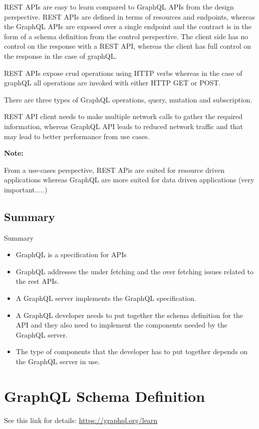 \documentclass[a4paper, 11pt]{book}
\newenvironment{note}{
    \begin{siderule}
        \textbf{Note: }
        }{
    \end{siderule}
}
\begin{document}
    REST APIs are easy to learn compared to GraphQL APIs from the design perspective.
    REST APIs are defined in terms of resources and endpoints, whereas the GraphQL APIs are exposed over a single endpoint and the contract is in the form of a schema definition from the control perspective.
    The client side has no control on the response with a REST API, whereas the client has full control on the response in the case of graphQL.

    REST APIs expose crud operations using HTTP verbs whereas in the case of graphQL all operations are invoked with either HTTP GET or POST.

    There are three types of GraphQL operations, query, mutation and subscription.

    REST API client needs to make multiple network calls to gather the required information, whereas GraphQL API leads to reduced network traffic and that may lead to better performance from use cases.

    \begin{note}
        From a use-cases perspective, REST APis are suited for resource driven applications whereas GraphQL are more suited for data driven applications (very important.....)
    \end{note}

    \subsection{Summary}
    Summary

    \begin{itemize}
        \item GraphQL is a specification for APIs
        \item GraphQL addresses the under fetching and the over fetching issues related to the rest APIs.
        \item A GraphQL server implements the GraphQL specification.
        \item A GraphQL developer needs to put together the schema definition for the API and they also need to implement the components needed by the GraphQL server.
        \item The type of components that the developer has to put together depends on the GraphQL server in use.
    \end{itemize}


    \section{GraphQL Schema Definition}
    See this link for details: \href{https://graphql.org/learn}{https://graphql.org/learn}
\end{document}

